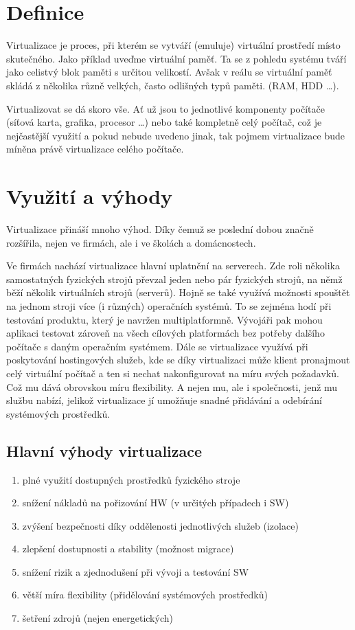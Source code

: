 \section{Definice}
Virtualizace je proces, při kterém se vytváří (emuluje) virtuální prostředí místo skutečného. Jako příklad uveďme virtuální paměť. Ta se z pohledu systému tváří jako celistvý blok paměti s určitou velikostí. Avšak v reálu se virtuální paměť skládá z několika různě velkých, často odlišných typů paměti. (RAM, HDD \dots).

Virtualizovat se dá skoro vše. Ať už jsou to jednotlivé komponenty počítače (síťová karta, grafika, procesor \dots) nebo také kompletně celý počítač, což je nejčastější využití a pokud nebude uvedeno jinak, tak pojmem virtualizace bude míněna právě virtualizace celého počítače.
\section{Využití a výhody}
Virtualizace přináší mnoho výhod. Díky čemuž se poslední dobou značně rozšířila, nejen ve firmách, ale i ve školách a domácnostech.

Ve firmách nachází virtualizace hlavní uplatnění na serverech. Zde roli několika samostatných fyzických strojů převzal jeden nebo pár fyzických strojů, na němž běží několik virtuálních strojů (serverů). Hojně se také využívá možnosti spouštět na jednom stroji více (i různých) operačních systémů. To se zejména hodí při testování produktu, který je navržen multiplatformně. Vývojáři pak mohou aplikaci testovat zároveň na všech cílových platformách bez potřeby dalšího počítače s daným operačním systémem. Dále se virtualizace využívá při poskytování hostingových služeb, kde se díky virtualizaci může klient pronajmout celý virtuální počítač a ten si nechat nakonfigurovat na míru svých požadavků. Což mu dává obrovskou míru flexibility. A nejen mu, ale i společnosti, jenž mu službu nabízí, jelikož virtualizace jí umožňuje snadné přidávání a odebírání systémových prostředků.

\subsection*{Hlavní výhody virtualizace}
\begin{enumerate}
  \item plné využití dostupných prostředků fyzického stroje
  \item snížení nákladů na pořizování HW (v určitých případech i SW)
  \item zvýšení bezpečnosti díky oddělenosti jednotlivých služeb (izolace)
  \item zlepšení dostupnosti a stability (možnost migrace)
  \item snížení rizik a zjednodušení při vývoji a testování SW
  \item větší míra flexibility (přidělování systémových prostředků)
  \item šetření zdrojů (nejen energetických)
\end{enumerate}
